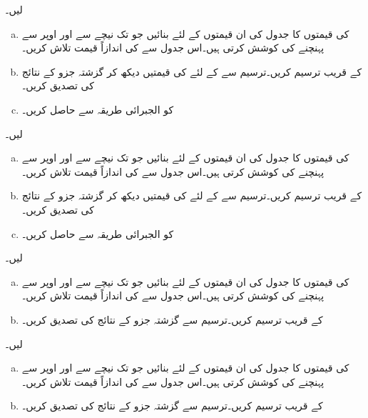 لیں۔
\begin{enumerate}[a.]
\item
{} کی قیمتوں کا جدول  کی ان قیمتوں کے لئے بنائیں جو  تک نیچے سے اور اوپر سے پہنچنے کی کوشش کرتی ہیں۔اس جدول سے  کی اندازاً قیمت تلاش کریں۔  
\item
{} کے قریب  ترسیم کریں۔ترسیم سے  کے لئے  کی قیمتیں دیکھ کر گزشتہ جزو کے نتائج کی تصدیق کریں۔
\item
{} کو الجبرائی طریقہ سے حاصل کریں۔
\end{enumerate}
 لیں۔
\begin{enumerate}[a.]
\item
{} کی قیمتوں کا جدول  کی ان قیمتوں کے لئے بنائیں جو  تک نیچے سے اور اوپر سے پہنچنے کی کوشش کرتی ہیں۔اس جدول سے
  کی اندازاً قیمت تلاش کریں۔  
\item
{} کے قریب  ترسیم کریں۔ترسیم سے  کے لئے  کی قیمتیں دیکھ کر گزشتہ جزو کے نتائج کی تصدیق کریں۔
\item
{} کو الجبرائی طریقہ سے حاصل کریں۔
\end{enumerate}
 لیں۔
\begin{enumerate}[a.]
\item
{} کی قیمتوں کا جدول  کی ان قیمتوں کے لئے بنائیں جو  تک نیچے سے اور اوپر سے پہنچنے کی کوشش کرتی ہیں۔اس جدول سے
  کی اندازاً قیمت تلاش کریں۔  
\item
{} کے قریب  ترسیم کریں۔ترسیم سے گزشتہ جزو کے نتائج کی تصدیق کریں۔
\end{enumerate}
 لیں۔
\begin{enumerate}[a.]
\item
{} کی قیمتوں کا جدول  کی ان قیمتوں کے لئے بنائیں جو  تک نیچے سے اور اوپر سے پہنچنے کی کوشش کرتی ہیں۔اس جدول سے
  کی اندازاً قیمت تلاش کریں۔  
\item
{} کے قریب  ترسیم کریں۔ترسیم سے گزشتہ جزو کے نتائج کی تصدیق کریں۔
\end{enumerate}
